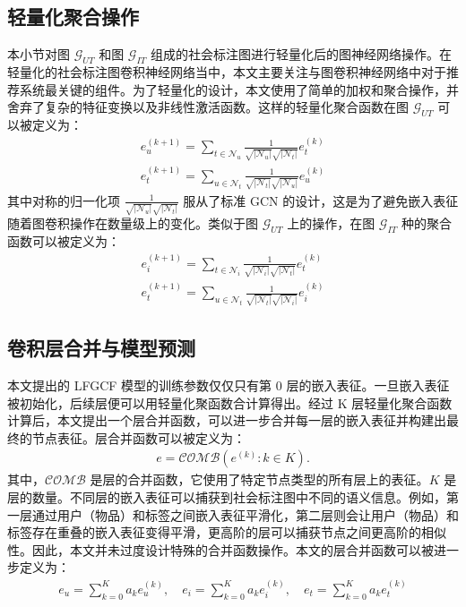 \subsection{轻量化聚合操作}
本小节对图 $\mathcal{G}_{UT}$ 和图 $\mathcal{G}_{IT}$ 组成的社会标注图进行轻量化后的图神经网络操作。在轻量化的社会标注图卷积神经网络当中，本文主要关注与图卷积神经网络中对于推荐系统最关键的组件。为了轻量化的设计，本文使用了简单的加权和聚合操作，并舍弃了复杂的特征变换以及非线性激活函数。这样的轻量化聚合函数在图 $\mathcal{G}_{UT}$ 可以被定义为：
\begin{equation}
    \begin{aligned}
        e_{u}^{(k+1)} = \sum_{t\in \mathcal{N}_{u}}\frac{1}{\sqrt{|\mathcal{N}_{u}|}\sqrt{|\mathcal{N}_{t}|}}e_t^{(k)} \\
        e_t^{(k+1)} = \sum_{u\in \mathcal{N}_t}\frac{1}{\sqrt{|\mathcal{N}_t|}\sqrt{|\mathcal{N}_{u}|}}e_{u}^{(k)}
    \end{aligned}
\end{equation}
其中对称的归一化项 $\frac{1}{\sqrt{|\mathcal{N}_{u}|}\sqrt{|\mathcal{N}_t|}}$ 服从了标准 GCN 的设计，这是为了避免嵌入表征随着图卷积操作在数量级上的变化。类似于图 $\mathcal{G}_{UT}$ 上的操作，在图 $\mathcal{G}_{IT}$ 种的聚合函数可以被定义为：
\begin{equation}
    \begin{aligned}
        e_{i}^{(k+1)} = \sum_{t\in \mathcal{N}_{i}}\frac{1}{\sqrt{|\mathcal{N}_{i}|}\sqrt{|\mathcal{N}_{t}|}}e_t^{(k)} \\
        e_t^{(k+1)} = \sum_{u\in \mathcal{N}_t}\frac{1}{\sqrt{|\mathcal{N}_t|}\sqrt{|\mathcal{N}_{i}|}}e_{i}^{(k)}
    \end{aligned}
\end{equation}

\subsection{卷积层合并与模型预测}
本文提出的 LFGCF 模型的训练参数仅仅只有第 0 层的嵌入表征。一旦嵌入表征被初始化，后续层便可以用轻量化聚函数合计算得出。经过 K 层轻量化聚合函数计算后，本文提出一个层合并函数，可以进一步合并每一层的嵌入表征并构建出最终的节点表征。层合并函数可以被定义为：
\begin{gather}
    e =\mathcal{COMB}(e^{(k)}:k \in K).
\end{gather}
其中，$\mathcal{COMB}$ 是层的合并函数，它使用了特定节点类型的所有层上的表征。$K$ 是层的数量。不同层的嵌入表征可以捕获到社会标注图中不同的语义信息。例如，第一层通过用户（物品）和标签之间嵌入表征平滑化，第二层则会让用户（物品）和标签存在重叠的嵌入表征变得平滑，更高阶的层可以捕获节点之间更高阶的相似性\cite{wang_neural_2019}。因此，本文并未过度设计特殊的合并函数操作。本文的层合并函数可以被进一步定义为：
\begin{gather}
    e_u= \sum_{k=0}^{K}a_ke_u^{(k)},\quad e_i = \sum_{k=0}^{K}a_ke_i^{(k)}, \quad e_t = \sum_{k=0}^{K}a_ke_t^{(k)}
\end{gather}

